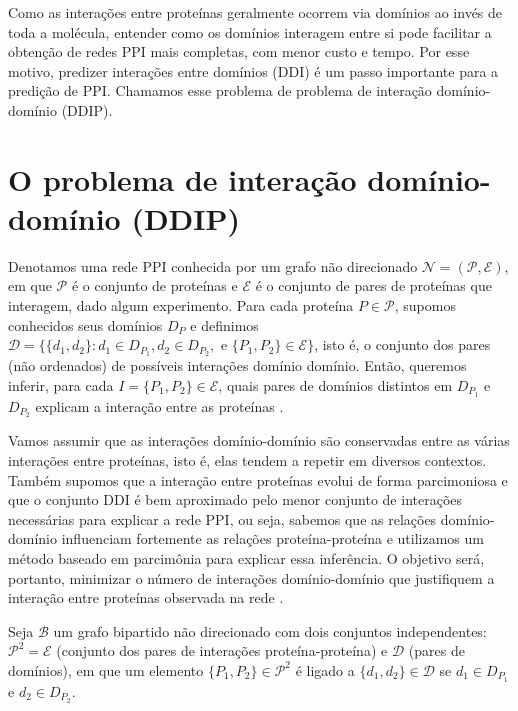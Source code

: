 \documentclass[11pt]{article}
\begin{document}
Como as interações entre proteínas geralmente ocorrem via domínios ao
invés de toda a molécula, entender como os domínios interagem entre si
pode facilitar a obtenção de redes PPI mais completas, com menor custo e
tempo. Por esse motivo, predizer interações entre domínios (DDI) é um
passo importante para a predição de PPI. Chamamos esse problema de
problema de interação domínio-domínio (DDIP).

\section{O problema de interação domínio-domínio (DDIP)}
\label{ddip}

Denotamos uma rede PPI conhecida por um grafo não direcionado
\(\mathcal{N} = (\mathcal{P}, \mathcal{E})\), em que \(\mathcal{P}\) é o
conjunto de proteínas e \(\mathcal{E}\) é o conjunto de pares de
proteínas que interagem, dado algum experimento. Para cada proteína
\(P \in \mathcal{P}\), supomos conhecidos seus domínios \(D_P\) e
definimos
\(\mathcal{D} = \{\{d_1, d_2\} : d_1 \in D_{P_1}, d_2 \in D_{P_2}, \text{ e } \{P_1, P_2\} \in \mathcal{E}\}\),
isto é, o conjunto dos pares (não ordenados) de possíveis interações
domínio domínio. Então, queremos inferir, para cada
\(I = \{P_1, P_2\} \in \mathcal{E}\), quais pares de domínios distintos
em \(D_{P_1}\) e \(D_{P_2}\) explicam a interação entre as proteínas
\cite{livro}.

Vamos assumir que as interações domínio-domínio são conservadas entre as
várias interações entre proteínas, isto é, elas tendem a repetir em
diversos contextos. Também supomos que a interação entre proteínas
evolui de forma parcimoniosa e que o conjunto DDI é bem aproximado pelo
menor conjunto de interações necessárias para explicar a rede PPI, ou
seja, sabemos que as relações domínio-domínio influenciam fortemente as
relações proteína-proteína e utilizamos um método baseado em parcimônia
para explicar essa inferência. O objetivo será, portanto, minimizar o
número de interações domínio-domínio que justifiquem a interação entre
proteínas observada na rede \cite{guimaraes}.

Seja \(\mathcal{B}\) um grafo bipartido não direcionado com dois
conjuntos independentes: \(\mathcal{P}^2 = \mathcal{E}\) (conjunto dos
pares de interações proteína-proteína) e \(\mathcal{D}\) (pares de
domínios), em que um elemento \(\{P_1, P_2\} \in \mathcal{P}^2\) é
ligado a \(\{d_1, d_2\} \in \mathcal{D}\) se \(d_1 \in D_{P_1}\) e
\(d_2 \in D_{P_2}\).
\end{document}
